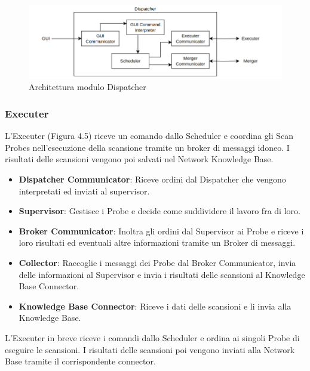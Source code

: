 \documentclass[target=bach,aauheader=,style=]{thud}
\begin{document}
\begin{figure}[t]
  \includegraphics[width=\columnwidth]{dispatcher}
  \centering
  \caption{Architettura modulo Dispatcher}
  \label{dispatcher}
\end{figure}

\FloatBarrier

\subsubsection{Executer} 
L'Executer (Figura 4.5) riceve un comando dallo Scheduler e coordina gli Scan Probes nell'esecuzione della scansione tramite un broker di messaggi idoneo. I risultati delle scansioni vengono poi salvati nel Network Knowledge Base.
\begin{itemize}
  \item \textbf{Dispatcher Communicator}: Riceve ordini dal Dispatcher che vengono interpretati ed inviati al supervisor.

  \item \textbf{Supervisor}: Gestisce i Probe e decide come suddividere il lavoro fra di loro. 

  \item \textbf{Broker Communicator}: Inoltra gli ordini dal Supervisor ai Probe e riceve i loro risultati ed eventuali altre informazioni tramite un Broker di messaggi.

  \item \textbf{Collector}: Raccoglie i messaggi dei Probe dal Broker Communicator, invia delle informazioni al Supervisor e invia i risultati delle scansioni al Knowledge Base Connector.

  \item \textbf{Knowledge Base Connector}: Riceve i dati delle scansioni e li invia alla Knowledge Base.
\end{itemize}

L'Executer in breve riceve i comandi dallo Scheduler e ordina ai singoli Probe di eseguire le scansioni. I risultati delle scansioni poi vengono inviati alla Network Base tramite il corrispondente connector.
\end{document}
